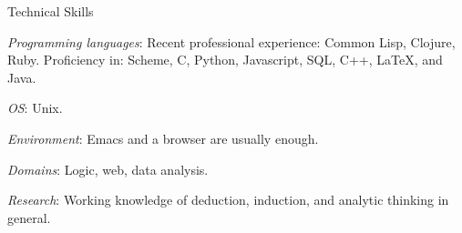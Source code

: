 \begin{rubric}{Technical Skills}{


  \entry* \emph{Programming languages}: Recent professional
  experience:  Common Lisp, Clojure, Ruby. Proficiency in:
  Scheme, C, Python, Javascript, SQL, C++, \LaTeX{}, and Java.

  \entry* \emph{OS}: Unix.

  \entry* \emph{Environment}: Emacs and a browser are usually enough.

  \entry* \emph{Domains}: Logic, web, data analysis.

  \entry* \emph{Research}: Working knowledge of deduction, induction,
  and analytic thinking in general.

}\end{rubric}
